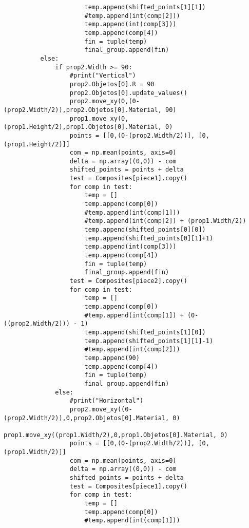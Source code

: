 \begin{verbatim}
                      temp.append(shifted_points[1][1])
                      #temp.append(int(comp[2]))
                      temp.append(int(comp[3]))
                      temp.append(comp[4])
                      fin = tuple(temp)
                      final_group.append(fin)
          else:
              if prop2.Width >= 90:
                  #print("Vertical")
                  prop2.Objetos[0].R = 90
                  prop2.Objetos[0].update_values()
                  prop2.move_xy(0,(0-(prop2.Width/2)),prop2.Objetos[0].Material, 90)
                  prop1.move_xy(0,(prop1.Height/2),prop1.Objetos[0].Material, 0)
                  points = [[0,(0-(prop2.Width/2))], [0,(prop1.Height/2)]]
                  com = np.mean(points, axis=0)
                  delta = np.array((0,0)) - com
                  shifted_points = points + delta
                  test = Composites[piece1].copy()
                  for comp in test:
                      temp = []
                      temp.append(comp[0])
                      #temp.append(int(comp[1]))
                      #temp.append(int(comp[2]) + (prop1.Width/2))
                      temp.append(shifted_points[0][0])
                      temp.append(shifted_points[0][1]+1)
                      temp.append(int(comp[3]))
                      temp.append(comp[4])
                      fin = tuple(temp)
                      final_group.append(fin)
                  test = Composites[piece2].copy()
                  for comp in test:
                      temp = []
                      temp.append(comp[0])
                      #temp.append(int(comp[1]) + (0-((prop2.Width/2))) - 1)
                      temp.append(shifted_points[1][0])
                      temp.append(shifted_points[1][1]-1)
                      #temp.append(int(comp[2]))
                      temp.append(90)
                      temp.append(comp[4])
                      fin = tuple(temp)
                      final_group.append(fin)
              else:
                  #print("Horizontal")
                  prop2.move_xy((0-(prop2.Width/2)),0,prop2.Objetos[0].Material, 0)
                  prop1.move_xy((prop1.Width/2),0,prop1.Objetos[0].Material, 0)
                  points = [[0,(0-(prop2.Width/2))], [0,(prop1.Width/2)]]
                  com = np.mean(points, axis=0)
                  delta = np.array((0,0)) - com
                  shifted_points = points + delta
                  test = Composites[piece1].copy()
                  for comp in test:
                      temp = []
                      temp.append(comp[0])
                      #temp.append(int(comp[1]))

\end{verbatim}
